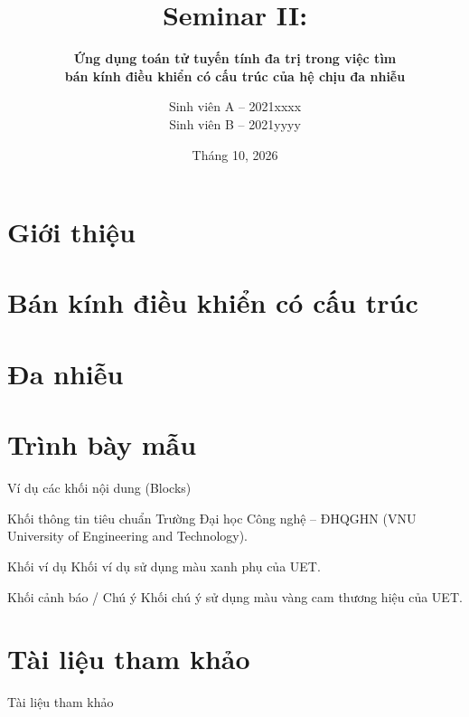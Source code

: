\documentclass[aspectratio=43]{beamer}
\title{Seminar II:}
\subtitle{\textbf{Ứng dụng toán tử tuyến tính đa trị trong việc tìm\\bán kính điều khiển có cấu trúc của hệ chịu đa nhiễu}}
\author{Sinh viên A -- 2021xxxx\\Sinh viên B -- 2021yyyy}
\date{Tháng 10, 2026}
\begin{document}
\begin{frame}
	\maketitle
\end{frame}

\section{Giới thiệu}


\section{Bán kính điều khiển có cấu trúc}

\section{Đa nhiễu}



\section{Trình bày mẫu}
\begin{frame}{Ví dụ các khối nội dung (Blocks)}
    \begin{block}{Khối thông tin tiêu chuẩn}
        Trường Đại học Công nghệ -- ĐHQGHN (VNU University of Engineering and Technology).
    \end{block}
    \begin{exampleblock}{Khối ví dụ}
        Khối ví dụ sử dụng màu xanh phụ của UET.
    \end{exampleblock}
    \begin{alertblock}{Khối cảnh báo / Chú ý}
        Khối chú ý sử dụng màu vàng cam thương hiệu của UET.
    \end{alertblock}
\end{frame}

\section{Tài liệu tham khảo}
\begin{frame}{Tài liệu tham khảo}
    \nocite{*}
    
    
\end{frame}

\begin{frame}
\end{frame}
\end{document}
